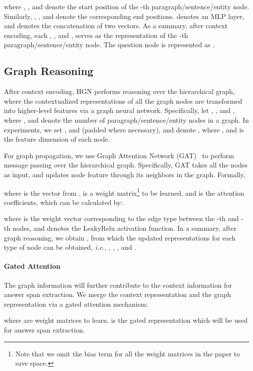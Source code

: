 \documentclass[11pt,a4paper]{article}
\begin{document}
where , , and   denote the start position of the -th paragraph/sentence/entity node. Similarly, , , and  denote the corresponding end positions.  denotes an MLP layer, and  denotes the concatenation of two vectors. As a summary, after context encoding, each , , and , serves as the representation of the -th paragraph/sentence/entity node. The question node is represented as .

\subsection{Graph Reasoning} \label{sec:reasoning}
After context encoding, HGN performs reasoning over the hierarchical graph, where the contextualized representations of all the graph nodes are transformed into higher-level features via a graph neural network. Specifically, let , , and , where ,  and  denote the number of paragraph/sentence/entity nodes in a graph. In experiments, we set ,  and  (padded where necessary), 
and denote , where , and  is the feature dimension of each node. 


For graph propagation, we use Graph Attention Network (GAT)~\cite{GAT} to perform message passing over the hierarchical graph. Specifically, GAT takes all the nodes as input, and updates node feature  through its neighbors  in the graph. Formally,

where  is the  vector from ,  is a weight matrix\footnote{Note that we omit the bias term for all the weight matrices in the paper to save space.} to be learned, and  is the attention coefficients, which can be calculated by:
 
where  is the weight vector corresponding to the edge type  between the -th and -th nodes, and  denotes the LeakyRelu activation function. 
In a summary, after graph reasoning, we obtain , from which the updated representations for each type of node can be obtained, \emph{i.e.}, , , , and .

\paragraph{Gated Attention} 
The graph information will further contribute to the context information for answer span extraction.
We merge the context representation  and the graph representation  via a gated attention mechanism:  

where  are weight matrices to learn. 
 is the gated representation which will be used for answer span extraction.
\end{document}
